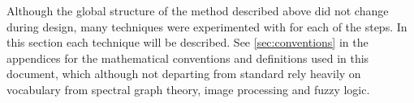 Although the global structure of the method described above did not change during design, many techniques were experimented with for each of the steps. In this section each technique will be described. See \autoref{sec:conventions} in the appendices for the mathematical conventions and definitions used in this document, which although not departing from standard rely heavily on vocabulary from spectral graph theory, image processing and fuzzy logic.







